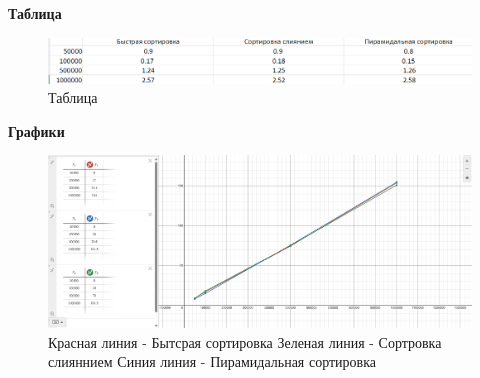 \documentclass[bachelor, och, referat, times]{SCWorks}
\begin{document}
    
   
    
    \maketitle

    

    
    
   
    
    
    
    

    \textbf{Таблица} 

\begin{figure}[H]
    \includegraphics[width=1\linewidth]{Снимок экрана 2025-03-10 141110.png}
    \caption{Таблица}
\end{figure}

\textbf{Графики} 
\begin{figure}[H]
    \includegraphics[width=1\linewidth]{Снимок экрана 2025-03-10 142132.png}
    \caption{Красная линия - Бытсрая сортировка
    Зеленая линия - Сортровка слияннием
    Синия линия - Пирамидальная сортировка}
\end{figure}

    \appendix
     
\end{document}
